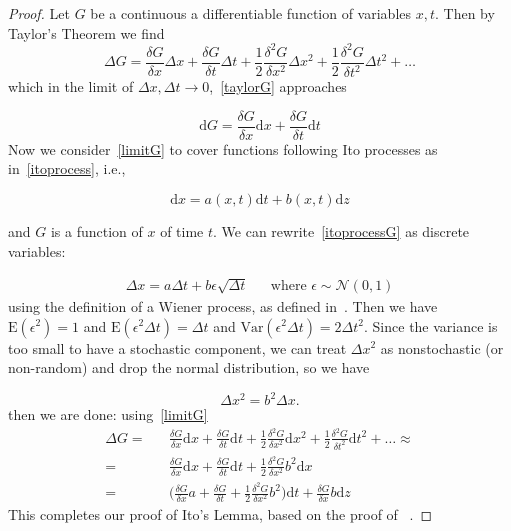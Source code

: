 \documentclass[11pt]{article} %
\begin{document}
\begin{proof}
    Let $G$ be a continuous a differentiable function of variables $x, t$. 
    Then by Taylor's Theorem we find
    \begin{equation}\label{taylorG}
        \Delta G = \frac{\delta G}{\delta x}\Delta x + 
        \frac{\delta G}{\delta t}\Delta t + 
        \frac{1}{2} \frac{\delta^2 G}{\delta x^2}\Delta x^2 + 
        \frac{1}{2} \frac{\delta^2 G}{\delta t^2}\Delta t^2 + \dots
    \end{equation}
    which in the limit of $\Delta x, \Delta t \to 0$,~\eqref{taylorG} approaches

    \begin{equation}\label{limitG}
        \mathrm{d}G = \frac{\delta G}{\delta x}\mathrm{d}x + 
        \frac{\delta G}{\delta t}\mathrm{d}t
    \end{equation}
    Now we consider~\eqref{limitG} to cover functions following Ito processes as 
    in~\eqref{itoprocess}, i.e.,

    \begin{equation}\label{itoprocessG}
        \mathrm{d}x = a(x,t)\mathrm{d}t + b(x,t)\mathrm{d}z
    \end{equation}

    and $G$ is a function of $x$ of time $t$. We can rewrite~\eqref{itoprocessG} 
    as discrete variables:

    \begin{align}
        \Delta x = a\Delta t + b \epsilon \sqrt{\Delta t}
         && \text{where $\epsilon \sim \mathcal{N}(0,1)$}
    \end{align}
using the definition of a Wiener process, as defined in~\cite{optionsderivatives}. 
Then we have $\mathrm{E}(\epsilon^2) = 1$  and $\mathrm{E}(\epsilon^2  \Delta t) =
 \Delta t$ and $\mathrm{Var}(\epsilon^2  \Delta t) = 2\Delta t ^2$. Since the variance 
 is too small to have a stochastic component, we can treat $\Delta x ^2$ as nonstochastic 
(or non-random) and drop the normal distribution, so we have 

\[\Delta x^2 = b^2\Delta x.\]
 then we are done: using~\eqref{limitG} 
\begin{align}
    \Delta G =&& \frac{\delta G}{\delta x} \mathrm{d} x + 
    \frac{\delta G}{\delta t} \mathrm{d} t + 
    \frac{1}{2} \frac{\delta^2 G}{\delta x^2} \mathrm{d} x^2 + 
    \frac{1}{2} \frac{\delta^2 G}{\delta t^2} \mathrm{d} t^2 + \dots \approx \\
    =&& \frac{\delta G}{\delta x} \mathrm{d} x + 
    \frac{\delta G}{\delta t} \mathrm{d} t + 
    \frac{1}{2} \frac{\delta^2 G}{\delta x^2} b^2 \mathrm{d} x\\
    =&& \bigg(\frac{\delta G}{\delta x}a+ \frac{\delta G}{\delta t} + \frac{1}{2} 
    \frac{\delta^2 G}{\delta x^2} b^2 \bigg)\mathrm{d}t + \frac{\delta G}{\delta x} 
    b \mathrm{d}z
\end{align}
This completes our proof of Ito's Lemma, based on the proof of 
~\cite{optionsderivatives}.
\end{proof}
\end{document}
